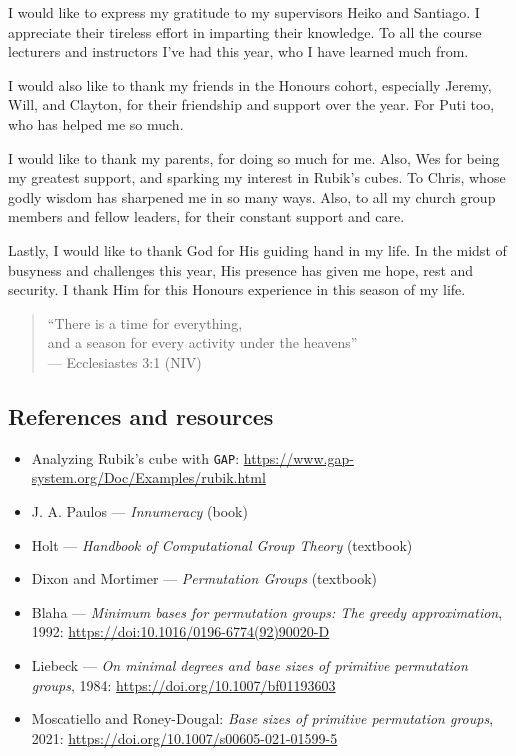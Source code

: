 \documentclass[handout]{beamer}
\begin{document}
\begin{slide}
    \scriptsize

    I would like to express my gratitude to my supervisors Heiko and Santiago. I appreciate their tireless effort in imparting their knowledge. To all the course lecturers and instructors I've had this year, who I have learned much from.

    I would also like to thank my friends in the Honours cohort, especially Jeremy, Will, and Clayton, for their friendship and support over the year. For Puti too, who has helped me so much.

    I would like to thank my parents, for doing so much for me. Also, Wes for being my greatest support, and sparking my interest in Rubik's cubes. To Chris, whose godly wisdom has sharpened me in so many ways. Also, to all my church group members and fellow leaders, for their constant support and care.

    Lastly, I would like to thank God for His guiding hand in my life. In the midst of busyness and challenges this year, His presence has given me hope, rest and security. I thank Him for this Honours experience in this season of my life.

    \vspace{0.25cm}
    \begin{quote}
        ``There is a time for everything, \\
        \hspace*{15pt} and a season for every activity under the heavens'' \\
        \null\hfill --- Ecclesiastes 3:1 (NIV)
    \end{quote}
\end{slide}


\subsection{References and resources}

\begin{slide}
    \small
    \begin{itemize}
        \item Analyzing Rubik's cube with \texttt{GAP}: \url{https://www.gap-system.org/Doc/Examples/rubik.html}
        \item J. A. Paulos --- \textit{Innumeracy} (book)
        \item Holt --- \textit{Handbook of Computational Group Theory} (textbook)
        \item Dixon and Mortimer --- \textit{Permutation Groups} (textbook)
        \item Blaha --- \textit{Minimum bases for permutation groups: The greedy approximation}, 1992: \url{https://doi:10.1016/0196-6774(92)90020-D}
        \item Liebeck --- \textit{On minimal degrees and base sizes of primitive permutation groups}, 1984: \url{https://doi.org/10.1007/bf01193603}
        \item Moscatiello and Roney-Dougal: \textit{Base sizes of primitive permutation groups}, 2021: \url{https://doi.org/10.1007/s00605-021-01599-5}
    \end{itemize}
\end{slide}
\end{document}
